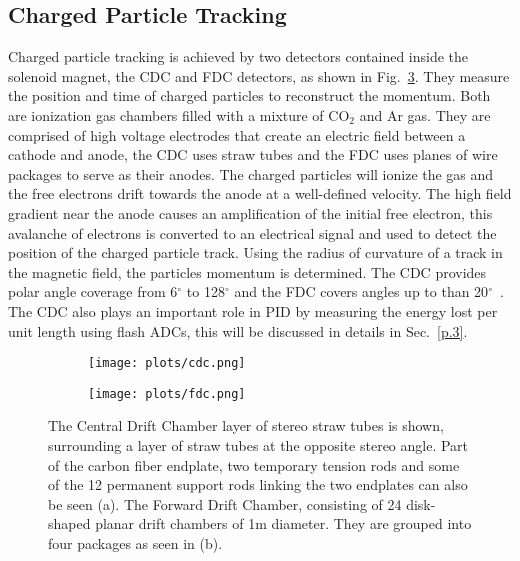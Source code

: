 \subsection{Charged Particle Tracking}
\label{p.2.2.2}

Charged particle tracking is achieved by two detectors contained inside the solenoid magnet, the CDC and FDC detectors, as shown in Fig.~\ref{fig.2.2.2}. They measure the position and time of charged particles to reconstruct the momentum. Both are ionization gas chambers filled with a mixture of CO$_2$ and Ar gas. They are comprised of high voltage electrodes that create an electric field between a cathode and anode, the CDC uses straw tubes and the FDC uses planes of wire packages to serve as their anodes. The charged particles will ionize the gas and the free electrons drift towards the anode at a well-defined velocity. The high field gradient near the anode causes an amplification of the initial free electron, this avalanche of electrons is converted to an electrical signal and used to detect the position of the charged particle track. Using the radius of curvature of a track in the magnetic field, the particles momentum is determined. The CDC provides polar angle coverage from 6$^{\circ}$ to 128$^{\circ}$ and the FDC covers angles up to than 20$^{\circ}$~\cite{31}. The CDC also plays an important role in PID by measuring the energy lost per unit length using flash ADCs, this will be discussed in details in Sec.~\ref{p.3}.

\begin{figure}[H]
    \centering
    \begin{subfigure}[b]{0.6\textwidth}
        \texttt{[image: plots/cdc.png]}
        \caption{}
        \label{fig.2.2.2.a}
    \end{subfigure}
    \begin{subfigure}[b]{0.6\textwidth}
        \texttt{[image: plots/fdc.png]}
        \caption{}
        \label{fig.2.2.2.b}
    \end{subfigure}
    \caption{The Central Drift Chamber layer of stereo straw tubes is shown, surrounding a layer of straw tubes at the opposite stereo angle. Part of the carbon fiber endplate, two temporary tension rods and some of the 12 permanent support rods linking the two endplates can also be seen (a). The Forward Drift Chamber, consisting of 24 disk-shaped planar drift chambers of 1m diameter. They are grouped into four packages as seen in (b).}
    \label{fig.2.2.2}
\end{figure}


